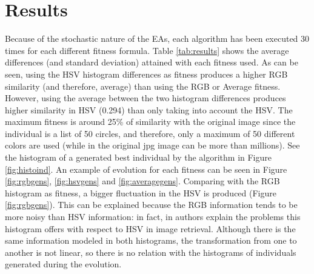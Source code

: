\section{Results}
\label{sec:results}

\noindent Because of the stochastic nature of the EAs, each algorithm
has been executed 30 times for each different fitness formula. Table
\ref{tab:results} shows the average differences (and standard
deviation) attained with each fitness used. As can be seen, using the
HSV histogram differences as fitness produces a higher RGB similarity
(and therefore, average) than using the RGB or Average
fitness. However, using the average between the two histogram
differences produces higher similarity in HSV (0.294) than only taking
into account the HSV. The maximum fitness is around 25\% of similarity
with the original image since the individual is a list of 50 circles,
and therefore, only a maximum of 50 different colors are used (while
in the original jpg image can be more than millions). See the
histogram of a generated best individual by the algorithm in Figure
\ref{fig:histoind}. An example of evolution for each fitness can be
seen in Figure \ref{fig:rgbgens}, \ref{fig:hsvgens} and
\ref{fig:averagegens}. Comparing with the RGB histogram as fitness, a
bigger fluctuation in the HSV is produced (Figure
\ref{fig:rgbgens}). This can be explained because the RGB information
tends to be more noisy than HSV information: in fact, in
\cite{COLORDIFFERENCES} authors explain the problems this histogram
offers with respect to HSV in image retrieval. Although there is the
same information modeled in both histograms, the transformation from
one to another is not linear, so there is no relation with the
histograms of individuals generated during the evolution. 

\begin{table}
\caption{Results for the different fitness (average of the 30 executions and standard deviation). Only one histogram type is used for fitness calculation, but the other values obtained are also added.}
\label{tab:results}
\end{table}

